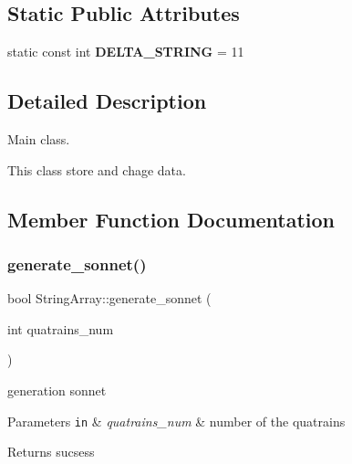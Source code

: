 \subsection*{Static Public Attributes}
\begin{DoxyCompactItemize}
\item 
\mbox{\label{class_string_array_a26f3f258c6a019accd8de894a7af797c}} 
static const int {\bfseries D\+E\+L\+T\+A\+\_\+\+S\+T\+R\+I\+NG} = 11
\end{DoxyCompactItemize}


\subsection{Detailed Description}
Main class. 

This class store and chage data. 

\subsection{Member Function Documentation}
\mbox{\label{class_string_array_a5ece78845303559bcbbddac65fd43d0e}} 
\subsubsection{\texorpdfstring{generate\+\_\+sonnet()}{generate\_sonnet()}}
{\footnotesize\ttfamily bool String\+Array\+::generate\+\_\+sonnet (\begin{DoxyParamCaption}\item[{int}]{quatrains\+\_\+num }\end{DoxyParamCaption})}



generation sonnet 


\begin{DoxyParams}[1]{Parameters}
\mbox{\tt in}  & {\em quatrains\+\_\+num} & number of the quatrains\\
\hline
\end{DoxyParams}
\begin{DoxyReturn}{Returns}
sucsess 
\end{DoxyReturn}
\mbox{\label{class_string_array_acf2d98a2d86af02293de4bbe186b9f07}} 
